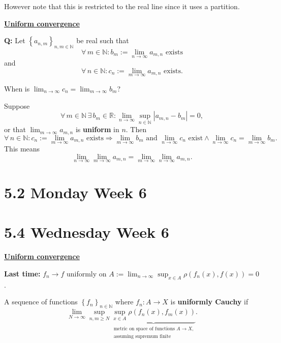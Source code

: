 \documentclass{notes}
\begin{document}
However note that this is restricted to the real line since it uses a partition.

{\boldmath \bfseries \underline{Uniform convergence}}

{\boldmath \bfseries Q:} Let $\left \{ a_{n, m} \right \}_{n, m \in \mathbb N}$ be real such that 
\[
  \forall \, m \in \mathbb N: b_m := \lim_{n \to \infty} a_{m, n} \text{ exists}
\]
and 
\[
  \forall \, n \in \mathbb N: c_n := \lim_{m \to \infty} a_{m, n} \text{ exists.}
\]

When is $\lim_{n \to \infty} c_n = \lim_{m \to \infty} b_m$?

\newpage

\begin{lem}
  Suppose 
  \[
    \forall \, m \in \mathbb N\, \exists \, b_m \in \mathbb R: \lim_{n \to \infty} \sup_{n \in \mathbb N} \left | a_{m, n} - b_m \right | = 0, 
  \]
  or that $\lim_{m \to \infty} a_{m, n}$ is {\boldmath \bfseries uniform} in $n$.
  Then 
  \[
    \forall \, n \in \mathbb N: c_n := \lim_{m \to \infty} a_{m, n} \text{ exists} \Rightarrow \lim_{m \to \infty} b_m \text{ and } \lim_{n \to \infty} c_n \text{ exist} \land \lim_{n \to \infty} c_n = \lim_{m \to \infty} b_m.
  \]
  This means 
  \[
    \lim_{n \to \infty} \lim_{m \to \infty} a_{m, n} = \lim_{m \to \infty} \lim_{n \to \infty} a_{m, n}.
  \]
\end{lem}

\newpage

\section{5.2 Monday Week 6}

\newpage

\section{5.4 Wednesday Week 6}

{\boldmath \bfseries \underline{Uniform convergence}}

{\boldmath \bfseries Last time:} $f_n \to f$ uniformly on $A := \lim_{n \to \infty} \sup_{x \in A} \rho(f_n(x), f(x)) = 0$.

\begin{defn}
  A sequence of functions $\left \{ f_n \right \}_{n \in \mathbb N}$ where $f_n \colon A \to X$ is {\boldmath \bfseries uniformly Cauchy} if 
  \[
    \lim_{N \to \infty} \sup_{n, m \geq N} \underbrace{\sup_{x \in A} \rho(f_n(x), f_m(x))}_{\substack{\text{metric on space of functions $A \to X$,} \\ \text{assuming supremum finite}}}.
  \]
\end{defn}
\end{document}
